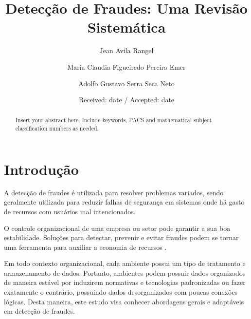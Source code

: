 \documentclass[smallextended]{svjour3}
\begin{document}
\title{Detecção de Fraudes: Uma Revisão Sistemática
}
\subtitle{}
\author{Jean Avila Rangel         \and
	Maria Claudia Figueiredo Pereira Emer \and
	Adolfo Gustavo Serra Seca Neto
}
	\date{Received: date / Accepted: date}
	\maketitle
	
	\begin{abstract}
		Insert your abstract here. Include keywords, PACS and mathematical
		subject classification numbers as needed.
	\end{abstract}
	
\section{Introdução}
\label{sec:1}

A detecção de fraudes é utilizada para resolver problemas variados, sendo geralmente utilizada para reduzir falhas de segurança em sistemas onde há gasto de recursos com usuários mal intencionados.

O controle organizacional de uma empresa ou setor pode garantir a sua boa estabilidade. Soluções para detectar, prevenir e evitar fraudes podem se tornar uma ferramenta para auxiliar a economia de recursos \citep{809570}. 

Em todo contexto organizacional, cada ambiente possui um tipo de tratamento e armazenamento de dados. Portanto, ambientes podem possuir dados organizados de maneira estável por induzirem normativas e tecnologias padronizadas ou fazer exatamente o contrário, possuindo dados desorganizados com poucas conexões lógicas. Desta maneira, este estudo visa conhecer abordagens gerais e adaptáveis em detecção de fraudes.
\end{document}

